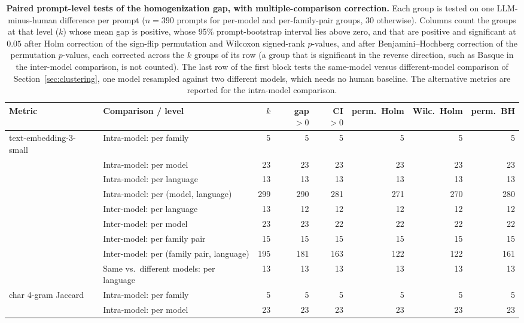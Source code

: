 \begin{table}[t]
\caption{\textbf{Paired prompt-level tests of the homogenization gap, with multiple-comparison correction.} Each group is tested on one LLM-minus-human difference per prompt ($n = 390$ prompts for per-model and per-family-pair groups, $30$ otherwise). Columns count the groups at that level ($k$) whose mean gap is positive, whose 95\% prompt-bootstrap interval lies above zero, and that are positive and significant at $0.05$ after Holm correction of the sign-flip permutation and Wilcoxon signed-rank $p$-values, and after Benjamini--Hochberg correction of the permutation $p$-values, each corrected across the $k$ groups of its row (a group that is significant in the reverse direction, such as Basque in the inter-model comparison, is not counted). The last row of the first block tests the same-model versus different-model comparison of Section~\ref{sec:clustering}, one model resampled against two different models, which needs no human baseline. The alternative metrics are reported for the intra-model comparison.}
\centering
\scriptsize
\setlength{\tabcolsep}{3pt}
\begin{tabular}{llrrrrrr}
\toprule
\textbf{Metric} & \textbf{Comparison / level} & $k$ & \textbf{gap}$>0$ & \textbf{CI}$>0$ & \textbf{perm.\ Holm} & \textbf{Wilc.\ Holm} & \textbf{perm.\ BH} \\
\midrule
text-embedding-3-small & Intra-model: per family & 5 & 5 & 5 & 5 & 5 & 5 \\
 & Intra-model: per model & 23 & 23 & 23 & 23 & 23 & 23 \\
 & Intra-model: per language & 13 & 13 & 13 & 13 & 13 & 13 \\
 & Intra-model: per (model, language) & 299 & 290 & 281 & 271 & 270 & 280 \\
 & Inter-model: per language & 13 & 12 & 12 & 12 & 12 & 12 \\
 & Inter-model: per model & 23 & 23 & 22 & 22 & 22 & 22 \\
 & Inter-model: per family pair & 15 & 15 & 15 & 15 & 15 & 15 \\
 & Inter-model: per (family pair, language) & 195 & 181 & 163 & 122 & 122 & 161 \\
 & Same vs.\ different models: per language & 13 & 13 & 13 & 13 & 13 & 13 \\
\midrule
char 4-gram Jaccard & Intra-model: per family & 5 & 5 & 5 & 5 & 5 & 5 \\
 & Intra-model: per model & 23 & 23 & 23 & 23 & 23 & 23 \\

\end{tabular}
\end{table}
